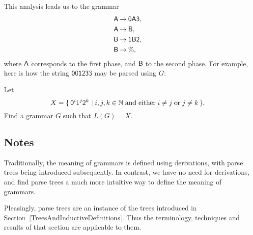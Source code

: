 This analysis leads us to the grammar
\begin{align*}
\mathsf{A} &\mathbin{\to} \mathsf{0}\mathsf{A}\mathsf{3} , \\
\mathsf{A} &\mathbin{\to} \mathsf{B} , \\
\mathsf{B} &\mathbin{\to} \mathsf{1}\mathsf{B}\mathsf{2} , \\
\mathsf{B} &\mathbin{\to} \% ,
\end{align*}
where $\mathsf{A}$ corresponds to the first phase, and $\mathsf{B}$ to the
second phase.
For example, here is how the string $\mathsf{001233}$ may be
parsed using $G$:
\begin{center}

\end{center}

\begin{exercise}
Let
\begin{displaymath}
X = \{ \, \mathsf{0}^i\mathsf{1}^j\mathsf{2}^k \mid i,j,k\in\mathbb{N}\;\allowbreak\mbox{and either}\allowbreak\;
i\neq j\;\allowbreak\mbox{or}\allowbreak\;j\neq k \, \} .
\end{displaymath}
Find a grammar $G$ such that $L(G)=X$.
\end{exercise}

\subsection{Notes}

Traditionally, the meaning of grammars is defined using derivations,
with parse trees being introduced subsequently.  In contrast, we have
no need for derivations, and find parse trees a much more intuitive
way to define the meaning of grammars.

Pleasingly, parse trees are an instance of the trees introduced in
Section~\ref{TreesAndInductiveDefinitions}.  Thus the terminology,
techniques and results of that section are applicable to them.

